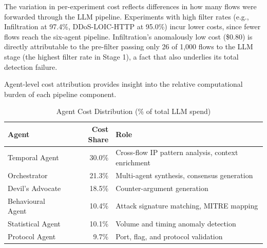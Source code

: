 \documentclass[../main.tex]{subfiles}
\begin{document}
The variation in per-experiment cost reflects differences in how many flows were forwarded through the LLM pipeline. Experiments with high filter rates (e.g., Infiltration at 97.4\%, DDoS-LOIC-HTTP at 95.0\%) incur lower costs, since fewer flows reach the six-agent pipeline. Infiltration's anomalously low cost (\$0.80) is directly attributable to the pre-filter passing only 26 of 1,000 flows to the LLM stage (the highest filter rate in Stage 1), a fact that also underlies its total detection failure.

Agent-level cost attribution provides insight into the relative computational burden of each pipeline component.

\begin{table}[H]
\centering
\caption{Agent Cost Distribution (\% of total LLM spend)}
\label{tab:agent-cost-distribution}
\begin{tabularx}{\textwidth}{l r X}
\toprule
Agent & Cost Share & Role \\
\midrule
Temporal Agent & 30.0\% & Cross-flow IP pattern analysis, context enrichment \\
Orchestrator & 21.3\% & Multi-agent synthesis, consensus generation \\
Devil's Advocate & 18.5\% & Counter-argument generation \\
Behavioural Agent & 10.4\% & Attack signature matching, MITRE mapping \\
Statistical Agent & 10.1\% & Volume and timing anomaly detection \\
Protocol Agent & 9.7\% & Port, flag, and protocol validation \\
\bottomrule
\end{tabularx}
\end{table}
\end{document}
